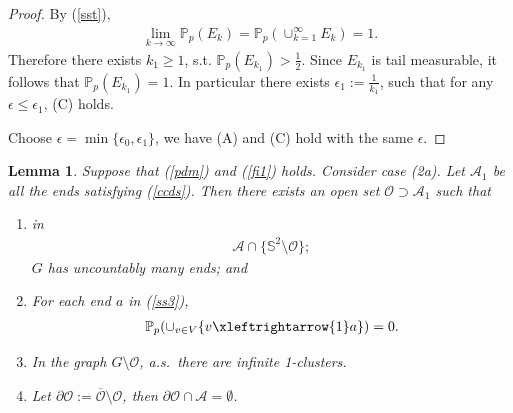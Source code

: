 \documentclass[11pt]{amsart}
\theoremstyle{plain}
\newtheorem{lemma}[theorem]{Lemma}
\numberwithin{equation}{section}
\numberwithin{figure}{section}
\newcommand\PP{{\mathbb P}}
\begin{document}
\begin{proof}
By (\ref{sst}), 
\begin{align*}
\lim_{k\rightarrow\infty}\PP_p(E_k)=\PP_p\left(\cup_{k=1}^{\infty}E_{k}\right)=1.
\end{align*}
Therefore there exists $k_1\geq 1$, s.t. $\PP_p(E_{k_1})>\frac{1}{2}$. Since $E_{k_1}$ is tail measurable, it follows that $\PP_p(E_{k_1})=1$. 
In particular there exists $\epsilon_1:=\frac{1}{k_1}$, such that for any $\epsilon\leq \epsilon_1$, (C) holds.

Choose $\epsilon =\min\{\epsilon_0,\epsilon_1\}$, we have (A) and (C) hold with the same $\epsilon$.
\end{proof}

\begin{lemma}\label{le7a}Suppose that (\ref{pdm}) and (\ref{fi1}) holds.
Consider case (2a).
Let $\mathcal{A}_1$ be all the ends satisfying (\ref{ccds}). Then there exists an open set $\mathcal{O}\supset \mathcal{A}_1$ such that 
\begin{enumerate}[label=(\Alph*)]
\item in
\begin{align}
\mathcal{A}\cap \{\mathbb{S}^2\setminus \mathcal{O}\};\label{ss3}
\end{align}
$G$ has uncountably many ends; and 
\item For each end $a$ in (\ref{ss3}), 
\begin{align}
\PP_p(\cup_{v\in V}\{v\xleftrightarrow{1} a\})=0.\label{ccd2}
\end{align}
\item In the graph $G\setminus \mathcal{O}$, a.s.~there are infinite 1-clusters.
\item Let $\partial{\mathcal{O}}:=\overline{\mathcal{O}}\setminus \mathcal{O}$, then $\partial \mathcal{O}\cap \mathcal{A}=\emptyset$.
\end{enumerate}
\end{lemma}
\end{document}

